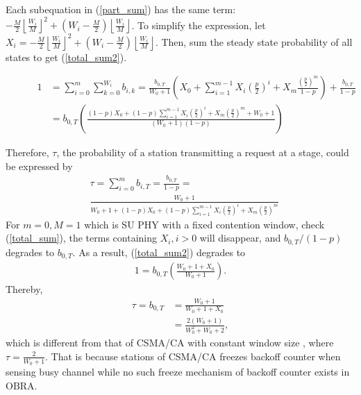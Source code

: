 \documentclass[journal]{IEEEtran}
\newcounter{MYtempeqncnt}
\begin{document}
Each subequation in (\ref{part_sum}) has the same term: $-\frac{M}{2}\left\lfloor \frac{W_i}{M}\right\rfloor ^2 + \left(W_i-\frac{M}{2}\right)\left\lfloor \frac{W_i}{M} \right\rfloor$. 
To simplify the expression, let $X_i = -\frac{M}{2}\left\lfloor \frac{W_i}{M}\right\rfloor ^2 + \left(W_i-\frac{M}{2}\right)\left\lfloor \frac{W_i}{M} \right\rfloor$. 
Then, sum the steady state probability of all states to get (\ref{total_sum2}).
\begin{figure}[!t]
\begin{align}
1 &= \sum_{i=0}^m \sum_{k=0}^{W_i}b_{i,k} 
 = \frac{b_{0,T}}{W_0+1}\left( X_0 + \sum_{i=1}^{m-1}X_i\left( \frac{p}{2}\right)^i + X_m\frac{\left( \frac{p}{2}\right)^m}{1-p}\right) + \frac{b_{0,T}}{1-p}\label{total_sum}\\
& = b_{0,T}\left( \frac{(1-p)X_0+(1-p) \sum_{i=1}^{m-1}X_i\left( \frac{p}{2}\right)^i+X_m\left( \frac{p}{2}\right)^m+W_0+1}{(W_0+1)(1-p)}\right) \label{total_sum2}
\end{align}
\hrulefill
\end{figure}
Therefore, $\tau$, the probability of a station transmitting a request at a stage, could be expressed by
\begin{align}
\label{tau_general}
&\tau = \sum_{i=0}^m b_{i,T} = \frac{b_{0,T}}{1-p} = \nonumber \\
&\frac{W_0+1}{W_0+1+(1-p)X_0+(1-p) \sum_{i=1}^{m-1}X_i\left( \frac{p}{2}\right)^i+X_m\left( \frac{p}{2}\right)^m}
\end{align}
For $m=0, M=1$ which is SU PHY with a fixed contention window, check (\ref{total_sum}), the terms containing $X_i, i>0$ will disappear, and $b_{0,T}/(1-p)$ degrades to $b_{0,T}$.
As a result, (\ref{total_sum2}) degrades to 
\begin{align}
1 = b_{0,T}\left( \frac{W_0+1+X_0}{W_0+1}\right).
\end{align}
Thereby, 
\begin{align}
\tau = b_{0,T} &= \frac{W_0+1}{W_0+1+X_0} \nonumber\\
				&= \frac{2(W_0+1)}{W_0^2+W_0+2},
\label{tau_W0}
\end{align}
which is different from that of CSMA/CA with constant window size \cite{ho1996performance}, where $\tau=\frac{2}{W_0+1}$.
That is because stations of CSMA/CA freezes backoff counter when sensing busy channel while no such freeze mechanism of backoff counter exists in OBRA. 
\end{document}
